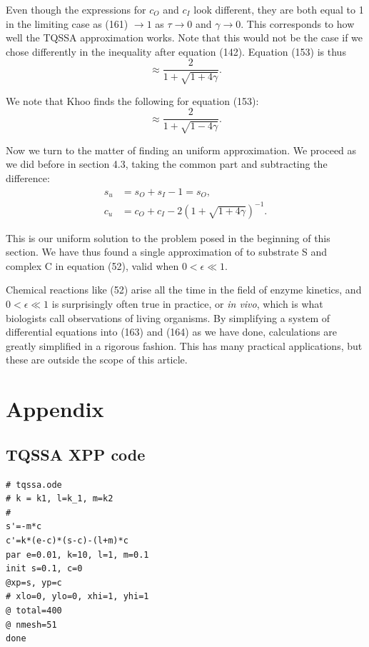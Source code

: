 \documentclass[12pt]{article}
\begin{document}
Even though the expressions for $c_O$ and $c_I$ look different, they
are both equal to 1 in the limiting case as (161) $\to 1$ as
$\tau \to 0$ and $\gamma \to 0$. This corresponds to how well the
TQSSA approximation works. Note that this would not be the case if we
chose differently in the inequality after equation (142). Equation
(153) is thus
\begin{equation}
\approx \frac{2} {1 + \sqrt{1+4\gamma}}.
\end{equation}

We note that Khoo finds the following for equation (153):
\begin{equation}
\approx \frac{2}{1+\sqrt{1-4\gamma}}.
\end{equation}

Now we turn to the matter of finding an uniform approximation. We
proceed as we did before in section 4.3, taking the common part and
subtracting the difference:
\begin{align}
s_u &= s_O + s_I - 1 = s_O, \\
c_u &= c_O + c_I - 2(1 + \sqrt{1+4\gamma})^{-1}.
\end{align}

This is our uniform solution to the problem posed in the beginning of
this section. We have thus found a single approximation of to
substrate S and complex C in equation (52), valid when
$0 < \epsilon \ll 1$.

Chemical reactions like (52) arise all the time in the field of enzyme
kinetics, and $0 < \epsilon \ll 1$ is surprisingly often true in
practice, or \textit{in vivo}, which is what biologists call
observations of living organisms. By simplifying a system of
differential equations into (163) and (164) as we have done,
calculations are greatly simplified in a rigorous fashion. This has
many practical applications, but these are outside the scope of this
article.

\newpage


\newpage
\section{Appendix}

\subsection{TQSSA XPP code}
\begin{verbatim}
# tqssa.ode
# k = k1, l=k_1, m=k2
#
s'=-m*c
c'=k*(e-c)*(s-c)-(l+m)*c
par e=0.01, k=10, l=1, m=0.1
init s=0.1, c=0
@xp=s, yp=c
# xlo=0, ylo=0, xhi=1, yhi=1
@ total=400
@ nmesh=51
done
\end{verbatim}
\end{document}

